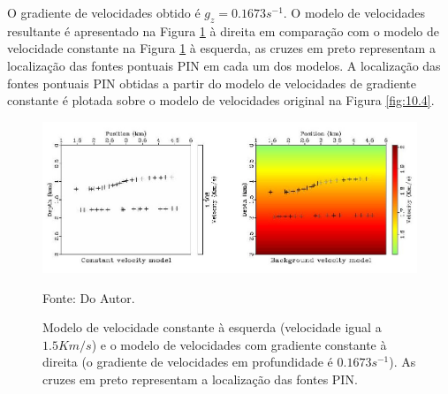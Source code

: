 O gradiente de velocidades obtido é $g_z=0.1673 s^{-1}$. O modelo de velocidades resultante é apresentado na
Figura \ref{fig:10.3} à direita em comparação com o modelo de velocidade constante na Figura \ref{fig:10.3}
à esquerda, as cruzes em preto representam a localização das fontes pontuais PIN em cada um dos modelos.
A localização das fontes pontuais PIN obtidas a partir do modelo de velocidades de gradiente constante
é plotada sobre o modelo de velocidades original na Figura \ref{fig:10.4}.

\begin{figure}[H]
\caption{Modelo de velocidade constante à esquerda (velocidade igual a $1.5Km/s$)
e o modelo de velocidades com gradiente constante à direita
(o gradiente de velocidades em profundidade é $0.1673 s^{-1}$).
As cruzes em preto representam a localização das fontes PIN.}
\begin{center}
\includegraphics[scale=2]{images/compare.jpeg}
\vspace{-0.3cm}
\end{center}
\begin{center}
 Fonte: Do Autor.
\end{center}
\label{fig:10.3}
\end{figure}

